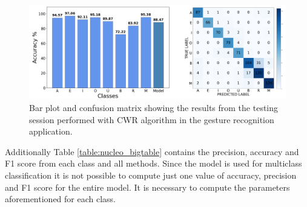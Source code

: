 \documentclass[12pt]{report}
\begin{document}
\begin{figure}[h!]
    \centering
    \includegraphics[width=140mm]{Figures/Chapter5/STM_barPlot_CWR.png} 
    \caption{Bar plot and confusion matrix showing the results from the testing session performed with CWR algorithm in the gesture recognition application.}
    \label{fig:letter_res_CWR}    
\end{figure}

Additionally Table \ref{table:nucleo_bigtable} contains the precision, accuracy and F1 score from each class and all methods. Since the model is used for multiclass classification it is not possible to compute just one value of accuracy, precision and F1 score for the entire model. It is necessary to compute the parameters aforementioned for each class.\\
\end{document}
